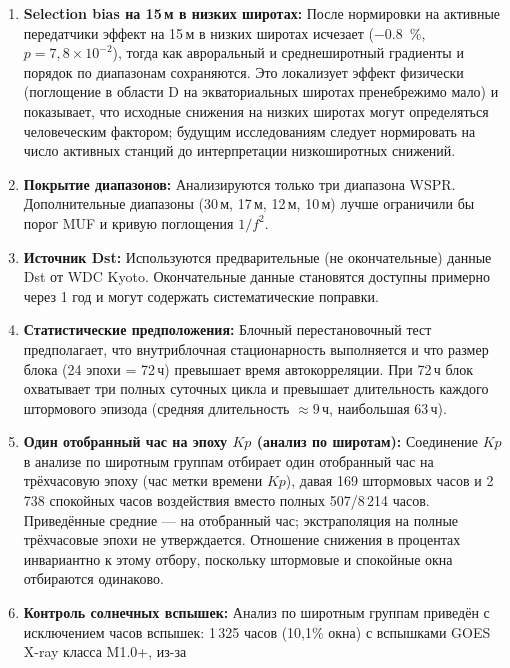 \documentclass{agujournal2019}
\begin{document}
\begin{enumerate}
	      Ур.~\eqref{eq:normtx} (споты на активный передатчик);
	      популяции приёмников и трасс остаются остаточным
	      мешающим фактором.
	\item \textbf{Selection bias на 15\,м в низких широтах:} После
	      нормировки на активные передатчики эффект на 15\,м в низких
	      широтах исчезает (\SI{-0,8}{\percent}, $p = 7{,}8 \times 10^{-2}$),
	      тогда как авроральный и среднеширотный градиенты и порядок по
	      диапазонам сохраняются. Это локализует эффект физически
	      (поглощение в области D на экваториальных широтах
	      пренебрежимо мало) и показывает, что исходные снижения на
	      низких широтах могут определяться человеческим фактором;
	      будущим исследованиям следует нормировать на число активных
	      станций до интерпретации низкоширотных снижений.
	\item \textbf{Покрытие диапазонов:} Анализируются только три диапазона
	      WSPR. Дополнительные диапазоны (30\,м, 17\,м, 12\,м, 10\,м) лучше
	      ограничили бы порог MUF и кривую поглощения $1/f^2$.
	\item \textbf{Источник Dst:} Используются предварительные
	      (не окончательные) данные Dst от WDC Kyoto. Окончательные данные
	      становятся доступны примерно через 1 год и могут содержать
	      систематические поправки.
	\item \textbf{Статистические предположения:} Блочный перестановочный
	      тест предполагает, что внутриблочная стационарность выполняется
	      и что размер блока (24 эпохи = 72\,ч) превышает время
	      автокорреляции. При 72\,ч блок охватывает три полных суточных
	      цикла и превышает длительность каждого штормового эпизода
	      (средняя длительность $\approx 9$\,ч, наибольшая 63\,ч).
    \item \textbf{Один отобранный час на эпоху $Kp$ (анализ по широтам):}
          Соединение $Kp$ в анализе по широтным группам отбирает один
          отобранный час на трёхчасовую эпоху (час метки времени $Kp$),
          давая 169 штормовых часов и 2\,738 спокойных часов воздействия
          вместо полных 507/8\,214 часов. Приведённые средние --- на
          отобранный час; экстраполяция на полные трёхчасовые эпохи не
          утверждается. Отношение снижения в процентах инвариантно к
          этому отбору, поскольку штормовые и спокойные окна отбираются
          одинаково.
	\item \textbf{Контроль солнечных вспышек:} Анализ по
	      широтным группам приведён с исключением часов вспышек:
	      1\,325 часов (10,1\% окна) с вспышками GOES X-ray класса M1.0+, из-за

\end{enumerate}
\end{document}
